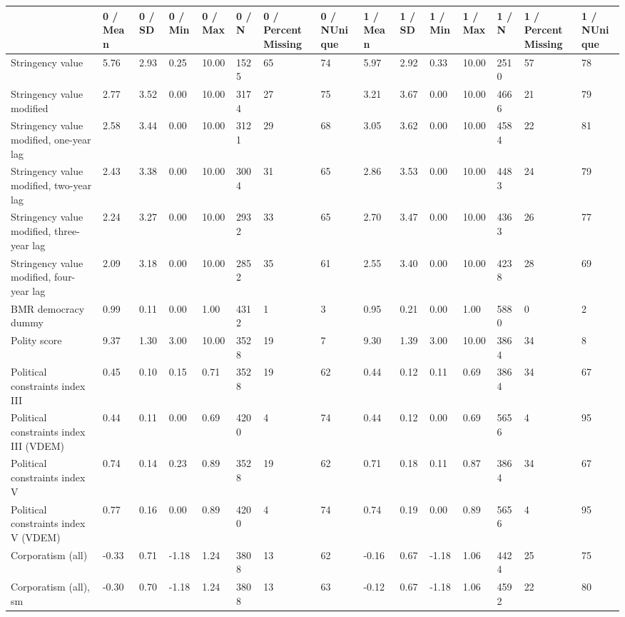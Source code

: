 
\begin{longtable}{lllllllllllllll}
\toprule
  & 0 / Mean & 0 / SD & 0 / Min & 0 / Max & 0 / N & 0 / PercentMissing & 0 / NUnique & 1 / Mean & 1 / SD & 1 / Min & 1 / Max & 1 / N & 1 / PercentMissing & 1 / NUnique\\
\midrule
Stringency value & 5.76 & 2.93 & 0.25 & 10.00 & 1525 & 65 & 74 & 5.97 & 2.92 & 0.33 & 10.00 & 2510 & 57 & 78\\
Stringency value modified & 2.77 & 3.52 & 0.00 & 10.00 & 3174 & 27 & 75 & 3.21 & 3.67 & 0.00 & 10.00 & 4666 & 21 & 79\\
Stringency value modified, one-year lag & 2.58 & 3.44 & 0.00 & 10.00 & 3121 & 29 & 68 & 3.05 & 3.62 & 0.00 & 10.00 & 4584 & 22 & 81\\
Stringency value modified, two-year lag & 2.43 & 3.38 & 0.00 & 10.00 & 3004 & 31 & 65 & 2.86 & 3.53 & 0.00 & 10.00 & 4483 & 24 & 79\\
Stringency value modified, three-year lag & 2.24 & 3.27 & 0.00 & 10.00 & 2932 & 33 & 65 & 2.70 & 3.47 & 0.00 & 10.00 & 4363 & 26 & 77\\
\addlinespace
Stringency value modified, four-year lag & 2.09 & 3.18 & 0.00 & 10.00 & 2852 & 35 & 61 & 2.55 & 3.40 & 0.00 & 10.00 & 4238 & 28 & 69\\
BMR democracy dummy & 0.99 & 0.11 & 0.00 & 1.00 & 4312 & 1 & 3 & 0.95 & 0.21 & 0.00 & 1.00 & 5880 & 0 & 2\\
Polity score & 9.37 & 1.30 & 3.00 & 10.00 & 3528 & 19 & 7 & 9.30 & 1.39 & 3.00 & 10.00 & 3864 & 34 & 8\\
Political constraints index III & 0.45 & 0.10 & 0.15 & 0.71 & 3528 & 19 & 62 & 0.44 & 0.12 & 0.11 & 0.69 & 3864 & 34 & 67\\
Political constraints index III (VDEM) & 0.44 & 0.11 & 0.00 & 0.69 & 4200 & 4 & 74 & 0.44 & 0.12 & 0.00 & 0.69 & 5656 & 4 & 95\\
\addlinespace
Political constraints index V & 0.74 & 0.14 & 0.23 & 0.89 & 3528 & 19 & 62 & 0.71 & 0.18 & 0.11 & 0.87 & 3864 & 34 & 67\\
Political constraints index V (VDEM) & 0.77 & 0.16 & 0.00 & 0.89 & 4200 & 4 & 74 & 0.74 & 0.19 & 0.00 & 0.89 & 5656 & 4 & 95\\
Corporatism (all) & -0.33 & 0.71 & -1.18 & 1.24 & 3808 & 13 & 62 & -0.16 & 0.67 & -1.18 & 1.06 & 4424 & 25 & 75\\
Corporatism (all), sm & -0.30 & 0.70 & -1.18 & 1.24 & 3808 & 13 & 63 & -0.12 & 0.67 & -1.18 & 1.06 & 4592 & 22 & 80\\

\end{longtable}

